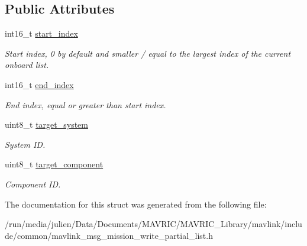 \subsection*{Public Attributes}
\begin{DoxyCompactItemize}
\item 
\hypertarget{struct____mavlink__mission__write__partial__list__t_a7001c48ce5da88acadbcbe40a56a0e43}{int16\+\_\+t \hyperlink{struct____mavlink__mission__write__partial__list__t_a7001c48ce5da88acadbcbe40a56a0e43}{start\+\_\+index}}\label{struct____mavlink__mission__write__partial__list__t_a7001c48ce5da88acadbcbe40a56a0e43}

\begin{DoxyCompactList}\small\item\em Start index, 0 by default and smaller / equal to the largest index of the current onboard list. \end{DoxyCompactList}\item 
\hypertarget{struct____mavlink__mission__write__partial__list__t_a98971b77ca596d8a92837a0836abf489}{int16\+\_\+t \hyperlink{struct____mavlink__mission__write__partial__list__t_a98971b77ca596d8a92837a0836abf489}{end\+\_\+index}}\label{struct____mavlink__mission__write__partial__list__t_a98971b77ca596d8a92837a0836abf489}

\begin{DoxyCompactList}\small\item\em End index, equal or greater than start index. \end{DoxyCompactList}\item 
\hypertarget{struct____mavlink__mission__write__partial__list__t_aa5e77ea55d7e908035fab2d1b0beb898}{uint8\+\_\+t \hyperlink{struct____mavlink__mission__write__partial__list__t_aa5e77ea55d7e908035fab2d1b0beb898}{target\+\_\+system}}\label{struct____mavlink__mission__write__partial__list__t_aa5e77ea55d7e908035fab2d1b0beb898}

\begin{DoxyCompactList}\small\item\em System I\+D. \end{DoxyCompactList}\item 
\hypertarget{struct____mavlink__mission__write__partial__list__t_a3e0c142d5a465fe2bf22e8c728be4a58}{uint8\+\_\+t \hyperlink{struct____mavlink__mission__write__partial__list__t_a3e0c142d5a465fe2bf22e8c728be4a58}{target\+\_\+component}}\label{struct____mavlink__mission__write__partial__list__t_a3e0c142d5a465fe2bf22e8c728be4a58}

\begin{DoxyCompactList}\small\item\em Component I\+D. \end{DoxyCompactList}\end{DoxyCompactItemize}


The documentation for this struct was generated from the following file\+:\begin{DoxyCompactItemize}
\item 
/run/media/julien/\+Data/\+Documents/\+M\+A\+V\+R\+I\+C/\+M\+A\+V\+R\+I\+C\+\_\+\+Library/mavlink/include/common/mavlink\+\_\+msg\+\_\+mission\+\_\+write\+\_\+partial\+\_\+list.\+h\end{DoxyCompactItemize}
